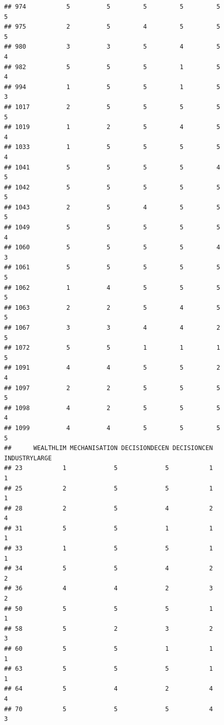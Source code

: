 \documentclass[
]{article}
\begin{document}
\begin{verbatim}
## 974           5          5         5         5         5             5
## 975           2          5         4         5         5             5
## 980           3          3         5         4         5             4
## 982           5          5         5         1         5             4
## 994           1          5         5         1         5             3
## 1017          2          5         5         5         5             5
## 1019          1          2         5         4         5             4
## 1033          1          5         5         5         5             4
## 1041          5          5         5         5         4             5
## 1042          5          5         5         5         5             5
## 1043          2          5         4         5         5             5
## 1049          5          5         5         5         5             4
## 1060          5          5         5         5         4             3
## 1061          5          5         5         5         5             5
## 1062          1          4         5         5         5             5
## 1063          2          2         5         4         5             5
## 1067          3          3         4         4         2             5
## 1072          5          5         1         1         1             5
## 1091          4          4         5         5         2             4
## 1097          2          2         5         5         5             5
## 1098          4          2         5         5         5             4
## 1099          4          4         5         5         5             5
##      WEALTHLIM MECHANISATION DECISIONDECEN DECISIONCEN INDUSTRYLARGE
## 23           1             5             5           1             1
## 25           2             5             5           1             1
## 28           2             5             4           2             4
## 31           5             5             1           1             1
## 33           1             5             5           1             1
## 34           5             5             4           2             2
## 36           4             4             2           3             2
## 50           5             5             5           1             1
## 58           5             2             3           2             3
## 60           5             5             1           1             1
## 63           5             5             5           1             1
## 64           5             4             2           4             4
## 70           5             5             5           4             3

\end{verbatim}
\end{document}
